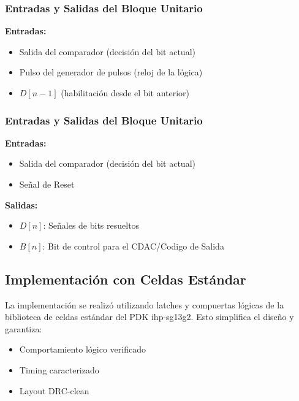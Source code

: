 \documentclass[12pt,a4paper]{report}
\begin{document}
\subsubsection{Entradas y Salidas del Bloque Unitario}

\textbf{Entradas:}
\begin{itemize}
    \item Salida del comparador (decisión del bit actual)
    \item Pulso del generador de pulsos (reloj de la lógica)
    \item $D[n-1]$ (habilitación desde el bit anterior)
\end{itemize}

\subsubsection{Entradas y Salidas del Bloque Unitario}

\textbf{Entradas:}
\begin{itemize}
    \item Salida del comparador (decisión del bit actual)
    \item Señal de Reset

\end{itemize}

\textbf{Salidas:}
\begin{itemize}
    \item $D[n]$: Señales de bits resueltos
    \item $B[n]$: Bit de control para el CDAC/Codigo de Salida 
\end{itemize}


\subsection{Implementación con Celdas Estándar}

La implementación se realizó utilizando latches y compuertas lógicas de la biblioteca de celdas estándar del PDK ihp-sg13g2. Esto simplifica el diseño y garantiza:
\begin{itemize}
    \item Comportamiento lógico verificado
    \item Timing caracterizado
    \item Layout DRC-clean
\end{itemize}
\end{document}
